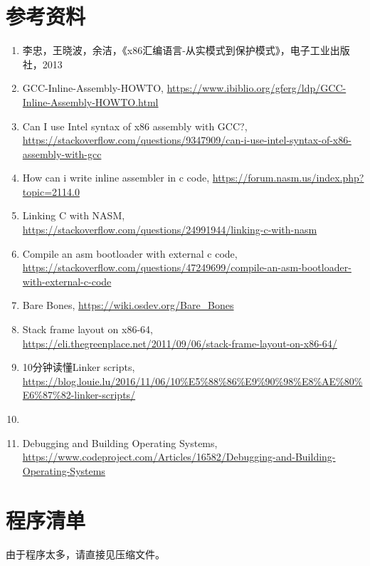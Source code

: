 \documentclass[logo,reportComp]{thesis}
\begin{document}
\section{参考资料}
\begin{enumerate}
	\item 李忠，王晓波，余洁，《x86汇编语言-从实模式到保护模式》，电子工业出版社，2013
	\item GCC-Inline-Assembly-HOWTO, \url{https://www.ibiblio.org/gferg/ldp/GCC-Inline-Assembly-HOWTO.html}
	\item Can I use Intel syntax of x86 assembly with GCC?, \url{https://stackoverflow.com/questions/9347909/can-i-use-intel-syntax-of-x86-assembly-with-gcc}
	\item How can i write inline assembler in c code, \url{https://forum.nasm.us/index.php?topic=2114.0}
	\item Linking C with NASM, \url{https://stackoverflow.com/questions/24991944/linking-c-with-nasm}
	\item Compile an asm bootloader with external c code, \url{https://stackoverflow.com/questions/47249699/compile-an-asm-bootloader-with-external-c-code}
    \item Bare Bones, \url{https://wiki.osdev.org/Bare_Bones}
    \item Stack frame layout on x86-64, \url{https://eli.thegreenplace.net/2011/09/06/stack-frame-layout-on-x86-64/}
    \item 10分钟读懂Linker scripts, \url{https://blog.louie.lu/2016/11/06/10%E5%88%86%E9%90%98%E8%AE%80%E6%87%82-linker-scripts/}
    \item 
    \item Debugging and Building Operating Systems, \url{https://www.codeproject.com/Articles/16582/Debugging-and-Building-Operating-Systems}
\end{enumerate}

\appendix
\appendixconfig
\section{程序清单}
\label{sec:code}
由于程序太多，请直接见压缩文件。
\end{document}
